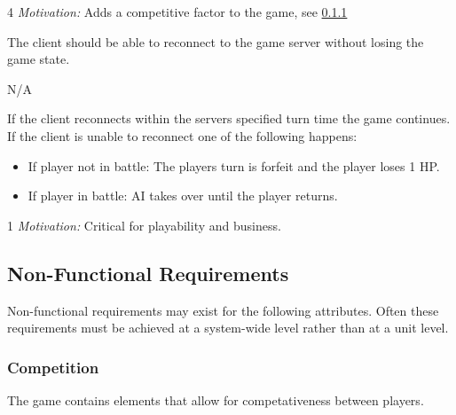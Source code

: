 4 \emph{Motivation:} Adds a competitive factor to the game, see \ref{req:competition}


\stoprequirement


\label{req:connectionlossstall}
The client should be able to reconnect to the game server without losing the game state.

N/A

If the client reconnects within the servers specified turn time the game continues. If the client is unable to reconnect one of the following happens:
\begin{itemize} 
	\item If player not in battle: The players turn is forfeit and the player loses 1 HP.  
	\item If player in battle: AI takes over until the player returns.
\end{itemize}

1 \emph{Motivation:} Critical for playability and business.


\stoprequirement

\subsection{Non-Functional Requirements}
Non-functional requirements may exist for the following attributes.  Often these requirements must be achieved at a system-wide level rather than at a unit level.  



\subsubsection{Competition}
\label{req:competition}
The game contains elements that allow for competativeness between players.

